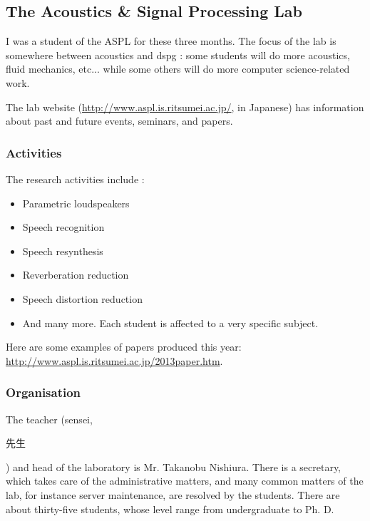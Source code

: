 \subsection{The Acoustics \& Signal Processing Lab}
I was a student of the \ac{ASPL} for these three months. The focus of the lab is somewhere between acoustics and \ac{dspg} : some students will do more acoustics, fluid mechanics, etc...  while some others will do more computer science-related work.

The lab website (\url{http://www.aspl.is.ritsumei.ac.jp/}, in Japanese) has information about past and future events, seminars, and papers. 
\subsubsection{Activities}
The research activities include :
\begin{itemize}
\item Parametric loudspeakers
\item Speech recognition
\item Speech resynthesis
\item Reverberation reduction
\item Speech distortion reduction
\item And many more. Each student is affected to a very specific subject.
\end{itemize}

Here are some examples of papers produced this year: \url{http://www.aspl.is.ritsumei.ac.jp/2013paper.htm}.

\subsubsection{Organisation}
The teacher (sensei, \begin{CJK}{UTF8}{min}先生\end{CJK}) and head of the laboratory is Mr. Takanobu Nishiura. There is a secretary, which takes care of the administrative matters, and many common matters of the lab, for instance server maintenance, are resolved by the students.
There are about thirty-five students, whose level range from undergraduate to Ph. D.